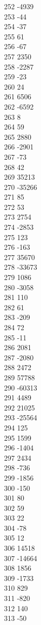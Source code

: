 { 252	-4939 \\
 253	-44 \\
 254	-37 \\
 255	61 \\
 256	-67 \\
 257	2350 \\
 258	-2287 \\
 259	-23 \\
 260	24 \\
 261	6506 \\
 262	-6592 \\
 263	8 \\
 264	59 \\
 265	2880 \\
 266	-2901 \\
 267	-73 \\
 268	42 \\
 269	35213 \\
 270	-35266 \\
 271	85 \\
 272	53 \\
 273	2754 \\
 274	-2853 \\
 275	123 \\
 276	-163 \\
 277	35670 \\
 278	-33673 \\
 279	1086 \\
 280	-3058 \\
 281	110 \\
 282	61 \\
 283	-209 \\
 284	72 \\
 285	-11 \\
 286	2081 \\
 287	-2080 \\
 288	2472 \\
 289	57788 \\
 290	-60313 \\
 291	4489 \\
 292	21025 \\
 293	-25564 \\
 294	125 \\
 295	1599 \\
 296	-1404 \\
 297	2434 \\
 298	-736 \\
 299	-1856 \\
 300	-150 \\
 301	80 \\
 302	59 \\
 303	22 \\
 304	-78 \\
 305	12 \\
 306	14518 \\
 307	-14664 \\
 308	1856 \\
 309	-1733 \\
 310	829 \\
 311	-820 \\
 312	140 \\
 313	-50 \\
}
